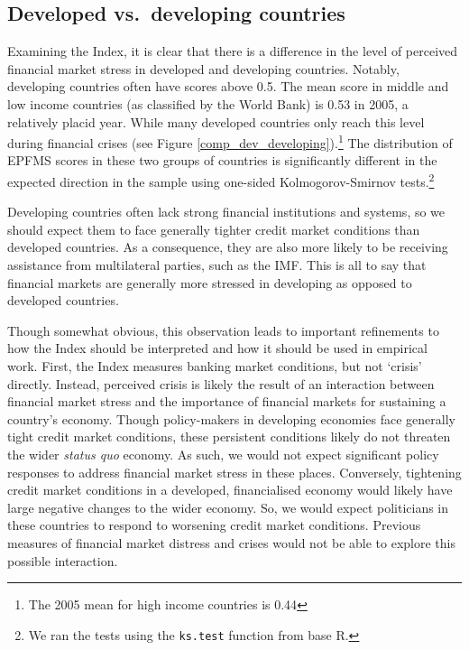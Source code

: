 \documentclass[]{article}
\begin{document}
\clearpage

\subsection{Developed vs.~developing
countries}\label{developed-vs.developing-countries}

Examining the Index, it is clear that there is a difference in the level of perceived financial market stress in developed and developing countries. Notably, developing countries often have scores above 0.5. The mean score in middle and low income countries (as classified by the World Bank) is 0.53 in 2005, a relatively placid year. While many developed countries only reach this level during financial crises (see Figure \ref{comp_dev_developing}).\footnote{The 2005 mean for high income countries is 0.44} The distribution of EPFMS scores in these two groups of countries is significantly different in the expected direction in the sample using one-sided Kolmogorov-Smirnov tests.\footnote{We ran the tests using the \texttt{ks.test} function from base R.}

Developing countries often lack strong financial institutions and systems, so we should expect them to face generally tighter credit market conditions than developed countries. As a consequence, they are also more likely to be receiving assistance from multilateral parties, such as the IMF. This is all to say that financial markets are generally more stressed in developing as opposed to developed countries.

Though somewhat obvious, this observation leads to important refinements to how the Index should be interpreted and how it should be used in empirical work. First, the Index measures banking market conditions, but not `crisis' directly. Instead, perceived crisis is likely the result of an interaction between financial market stress and the importance of financial markets for sustaining a country's economy. Though policy-makers in developing economies face generally tight credit market conditions, these persistent conditions likely do not threaten the wider \emph{status quo} economy. As such, we would not expect significant policy responses to address financial market stress in these places. Conversely, tightening credit market conditions in a developed, financialised economy would
likely have large negative changes to the wider economy. So, we would expect politicians in these countries to respond to worsening credit market conditions. Previous measures of financial market distress and crises would not be able to explore this possible interaction.
\end{document}
